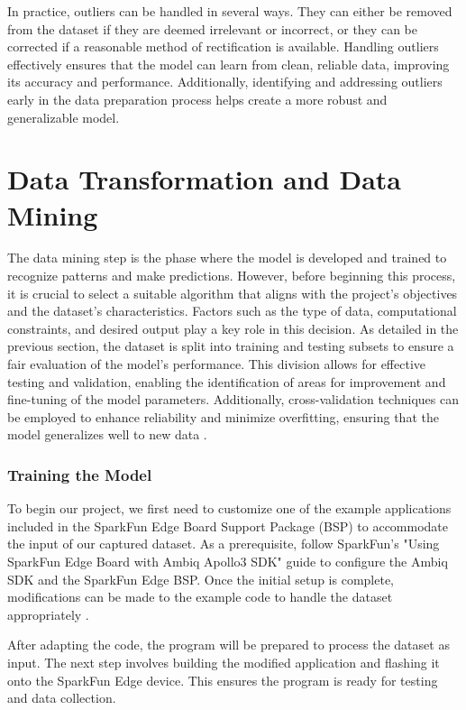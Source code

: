 In practice, outliers can be handled in several ways. They can either be removed from the dataset if they are deemed irrelevant or incorrect, or they can be corrected if a reasonable method of rectification is available. Handling outliers effectively ensures that the model can learn from clean, reliable data, improving its accuracy and performance. Additionally, identifying and addressing outliers early in the data preparation process helps create a more robust and generalizable model.

\section{Data Transformation and Data Mining}

The data mining step is the phase where the model is developed and trained to recognize patterns and make predictions. However, before beginning this process, it is crucial to select a suitable algorithm that aligns with the project's objectives and the dataset's characteristics. Factors such as the type of data, computational constraints, and desired output play a key role in this decision. As detailed in the previous section, the dataset is split into training and testing subsets to ensure a fair evaluation of the model’s performance. This division allows for effective testing and validation, enabling the identification of areas for improvement and fine-tuning of the model parameters. Additionally, cross-validation techniques can be employed to enhance reliability and minimize overfitting, ensuring that the model generalizes well to new data \cite{Warden:2020}.

\subsubsection{Training the Model}

To begin our project, we first need to customize one of the example applications included in the SparkFun Edge Board Support Package (BSP) to accommodate the input of our captured dataset. As a prerequisite, follow SparkFun's "Using SparkFun Edge Board with Ambiq Apollo3 SDK" guide to configure the Ambiq SDK and the SparkFun Edge BSP. Once the initial setup is complete, modifications can be made to the example code to handle the dataset appropriately \cite{Laine:2022}.

After adapting the code, the program will be prepared to process the dataset as input. The next step involves building the modified application and flashing it onto the SparkFun Edge device. This ensures the program is ready for testing and data collection.

